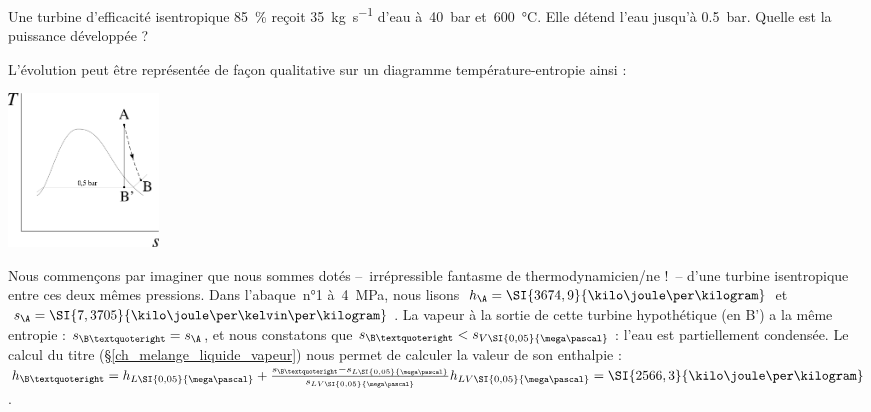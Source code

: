 		\begin{anexample}
		\label{exemple_turbine_centrale}
			Une turbine d’efficacité isentropique \SI{85}{\percent} reçoit \SI{35}{\kilogram\per\second} d’eau à~\SI{40}{\bar} et~\SI{600}{\degreeCelsius}. Elle détend l’eau jusqu’à \SI{0,5}{\bar}. Quelle est la puissance développée ?
				\begin{answer}
					L’évolution peut être représentée de façon qualitative sur un diagramme température-entropie ainsi :
						\begin{center}\onlyframabook{\vspace{-0.2cm}}\includegraphics[width=4cm]{images/exe_ts_turbine.png}\onlyframabook{\vspace{-0.2cm}}\end{center}
					Nous commençons par imaginer que nous sommes dotés --\ irrépressible fantasme de thermodynamicien/ne !\ -- d’une turbine isentropique entre ces deux mêmes pressions. Dans l’abaque~n°1 à~\SI{4}{\mega\pascal}, nous lisons $h_\A = \SI{3674,9}{\kilo\joule\per\kilogram}$ et $s_\A = \SI{7,3705}{\kilo\joule\per\kelvin\per\kilogram}$. La vapeur à la sortie de cette turbine hypothétique (en B’) a la même entropie : $s_{\B’} = s_\A$, et nous constatons que $s_{\B’} < s_{V \SI{0,05}{\mega\pascal}}$ : l’eau est partiellement condensée. Le calcul du titre (\S\ref{ch_melange_liquide_vapeur}) nous permet de calculer la valeur de son enthalpie : $h_{\B’} = h_{L \SI{0,05}{\mega\pascal}} + \frac{s_{\B’} - s_{L \SI{0,05}{\mega\pascal}}}{s_{LV \SI{0,05}{\mega\pascal}}} h_{LV \SI{0,05}{\mega\pascal}} = \SI{2566,3}{\kilo\joule\per\kilogram}$.
					

\end{answer}
\end{anexample}
